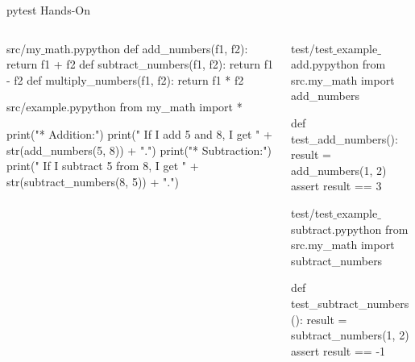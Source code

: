 \documentclass{setbeamer}
\begin{document}
\begin{frame}[fragile]{pytest Hands-On}
    \begin{columns}
        \begin{column}{0.6\textwidth}
            \begin{TUMCodeBlock}{src/my$\_$math.py}{python}
def add_numbers(f1, f2):
	return f1 + f2
def subtract_numbers(f1, f2):
	return f1 - f2
def multiply_numbers(f1, f2):
	return f1 * f2
            \end{TUMCodeBlock}

            \begin{TUMCodeBlock}{src/example.py}{python}
from my_math import *

print("* Addition:")
print(" If I add 5 and 8, I get " + str(add_numbers(5, 8)) + ".")
print("* Subtraction:")
print(" If I subtract 5 from 8, I get " + str(subtract_numbers(8, 5)) + ".")
            \end{TUMCodeBlock}
        \end{column}
        \begin{column}{0.4\textwidth}
            \begin{TUMCodeBlock}{test/test$\_$example$\_$add.py}{python}
from src.my_math import add_numbers


def test_add_numbers():
    result = add_numbers(1, 2)
    assert result == 3
            \end{TUMCodeBlock}
            \begin{TUMCodeBlock}{test/test$\_$example$\_$subtract.py}{python}
from src.my_math import subtract_numbers


def test_subtract_numbers():
    result = subtract_numbers(1, 2)
    assert result == -1
            \end{TUMCodeBlock}
        \end{column}
    \end{columns}
\end{frame}
\end{document}
